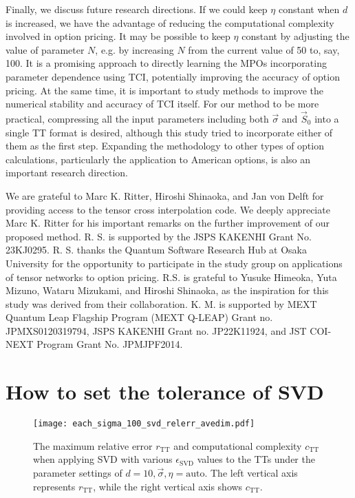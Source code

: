 Finally, we discuss future research directions. 
If we could keep $\eta$ constant when $d$ is increased, we have the advantage of reducing the computational complexity involved in option pricing.
It may be possible to keep $\eta$ constant by adjusting the value of parameter $N$, e.g. by increasing $N$ from the current value of 50 to, say, 100.
It is a promising approach to directly learning the MPOs incorporating parameter dependence using TCI, potentially improving the accuracy of option pricing. 
At the same time, it is important to study methods to improve the numerical stability and accuracy of TCI itself. 
For our method to be more practical, compressing all the input parameters including both $\vec{\sigma}$ and $\vec{S}_0$ into a single TT format is desired, although this study tried to incorporate either of them as the first step.
Expanding the methodology to other types of option calculations, particularly the application to American options, is also an important research direction.

\begin{acknowledgments}
We are grateful to Marc K. Ritter, Hiroshi Shinaoka, and Jan von Delft for providing access to the tensor cross interpolation code.
We deeply appreciate Marc K. Ritter for his important remarks on the further improvement of our proposed method.
R. S. is supported by the JSPS KAKENHI Grant No. 23KJ0295. 
R. S. thanks the Quantum Software Research Hub at Osaka University for the opportunity to participate in the study group on applications of tensor networks to option pricing.
R.S. is grateful to Yusuke Himeoka, Yuta Mizuno, Wataru Mizukami, and Hiroshi Shinaoka, as the inspiration for this study was derived from their collaboration.
K. M. is supported by MEXT Quantum Leap Flagship Program (MEXT Q-LEAP) Grant no. JPMXS0120319794, JSPS KAKENHI Grant no. JP22K11924, and JST COI-NEXT Program Grant No. JPMJPF2014.
\end{acknowledgments}






\appendix

\section{How to set the tolerance of SVD}\label{appendix:svd_tol}
\begin{figure}[ht]
    \centering
        \texttt{[image: each\_sigma\_100\_svd\_relerr\_avedim.pdf]}
        \caption{
        The maximum relative error $r_{\mathrm{TT}}$ and computational complexity $c_{\mathrm{TT}}$ when applying SVD with various $\epsilon_{\mathrm{SVD}}$ values to the TTs under the parameter settings of $d = 10, \vec{\sigma}, \eta = \text{auto}$. 
        The left vertical axis represents $r_{\mathrm{TT}}$, while the right vertical axis shows $c_{\mathrm{TT}}$.
        }
\label{fig:each_sigma_100_svd_relerr_avedim}
\end{figure}

